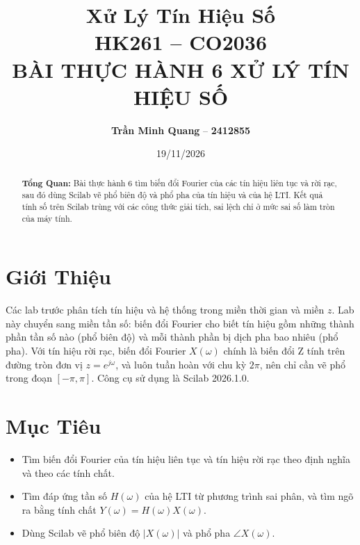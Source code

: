 \documentclass[12pt,a4paper]{article}
\title{
    \vspace{-1.5cm}
    \large\textbf{Xử Lý Tín Hiệu Số} \\
    \normalsize HK261 \quad -- \quad CO2036 \\[1em]
    \Large\textbf{BÀI THỰC HÀNH 6 XỬ LÝ TÍN HIỆU SỐ}
}
\author{
    \textbf{Trần Minh Quang} -- \textbf{2412855}
}
\date{19/11/2026}
\begin{document}
\maketitle

\begin{abstract}
\noindent\textbf{Tổng Quan:} Bài thực hành 6 tìm biến đổi Fourier của các tín hiệu liên tục và rời rạc, sau đó dùng Scilab vẽ phổ biên độ và phổ pha của tín hiệu và của hệ LTI. Kết quả tính số trên Scilab trùng với các công thức giải tích, sai lệch chỉ ở mức sai số làm tròn của máy tính.
\end{abstract}

\vspace{0.5cm}

\section{Giới Thiệu}
Các lab trước phân tích tín hiệu và hệ thống trong miền thời gian và miền $z$. Lab này chuyển sang miền tần số: biến đổi Fourier cho biết tín hiệu gồm những thành phần tần số nào (phổ biên độ) và mỗi thành phần bị dịch pha bao nhiêu (phổ pha). Với tín hiệu rời rạc, biến đổi Fourier $X(\omega)$ chính là biến đổi Z tính trên đường tròn đơn vị $z = e^{j\omega}$, và luôn tuần hoàn với chu kỳ $2\pi$, nên chỉ cần vẽ phổ trong đoạn $[-\pi, \pi]$. Công cụ sử dụng là Scilab 2026.1.0.

\section{Mục Tiêu}
\begin{itemize}
    \item Tìm biến đổi Fourier của tín hiệu liên tục và tín hiệu rời rạc theo định nghĩa và theo các tính chất.
    \item Tìm đáp ứng tần số $H(\omega)$ của hệ LTI từ phương trình sai phân, và tìm ngõ ra bằng tính chất $Y(\omega) = H(\omega)X(\omega)$.
    \item Dùng Scilab vẽ phổ biên độ $|X(\omega)|$ và phổ pha $\angle X(\omega)$.
\end{itemize}
\end{document}
